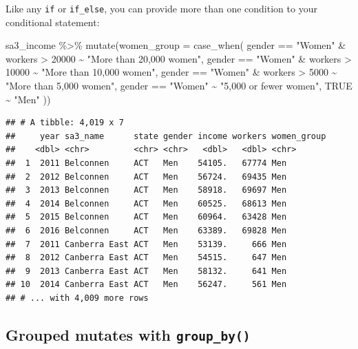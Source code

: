 \documentclass[
]{book}
\newenvironment{Shaded}{\begin{snugshade}}{\end{snugshade}}
\newcommand{\AttributeTok}[1]{\textcolor[rgb]{0.77,0.63,0.00}{#1}}
\newcommand{\ConstantTok}[1]{\textcolor[rgb]{0.00,0.00,0.00}{#1}}
\newcommand{\DecValTok}[1]{\textcolor[rgb]{0.00,0.00,0.81}{#1}}
\newcommand{\FunctionTok}[1]{\textcolor[rgb]{0.00,0.00,0.00}{#1}}
\newcommand{\NormalTok}[1]{#1}
\newcommand{\SpecialCharTok}[1]{\textcolor[rgb]{0.00,0.00,0.00}{#1}}
\newcommand{\StringTok}[1]{\textcolor[rgb]{0.31,0.60,0.02}{#1}}
\begin{document}
Like any \texttt{if} or \texttt{if\_else}, you can provide more than one condition to your conditional statement:

\begin{Shaded}
\begin{Highlighting}[]
\NormalTok{sa3\_income }\SpecialCharTok{\%\textgreater{}\%} 
  \FunctionTok{mutate}\NormalTok{(}\AttributeTok{women\_group =} \FunctionTok{case\_when}\NormalTok{(}
\NormalTok{    gender }\SpecialCharTok{==} \StringTok{"Women"} \SpecialCharTok{\&}\NormalTok{ workers }\SpecialCharTok{\textgreater{}} \DecValTok{20000} \SpecialCharTok{\textasciitilde{}} \StringTok{"More than 20,000 women"}\NormalTok{,}
\NormalTok{    gender }\SpecialCharTok{==} \StringTok{"Women"} \SpecialCharTok{\&}\NormalTok{ workers }\SpecialCharTok{\textgreater{}} \DecValTok{10000} \SpecialCharTok{\textasciitilde{}} \StringTok{"More than 10,000 women"}\NormalTok{,}
\NormalTok{    gender }\SpecialCharTok{==} \StringTok{"Women"} \SpecialCharTok{\&}\NormalTok{ workers }\SpecialCharTok{\textgreater{}}  \DecValTok{5000} \SpecialCharTok{\textasciitilde{}} \StringTok{"More than 5,000 women"}\NormalTok{,}
\NormalTok{    gender }\SpecialCharTok{==} \StringTok{"Women"}                  \SpecialCharTok{\textasciitilde{}} \StringTok{"5,000 or fewer women"}\NormalTok{,}
    \ConstantTok{TRUE} \SpecialCharTok{\textasciitilde{}} \StringTok{"Men"}
\NormalTok{  ))}
\end{Highlighting}
\end{Shaded}

\begin{verbatim}
## # A tibble: 4,019 x 7
##     year sa3_name      state gender income workers women_group
##    <dbl> <chr>         <chr> <chr>   <dbl>   <dbl> <chr>      
##  1  2011 Belconnen     ACT   Men    54105.   67774 Men        
##  2  2012 Belconnen     ACT   Men    56724.   69435 Men        
##  3  2013 Belconnen     ACT   Men    58918.   69697 Men        
##  4  2014 Belconnen     ACT   Men    60525.   68613 Men        
##  5  2015 Belconnen     ACT   Men    60964.   63428 Men        
##  6  2016 Belconnen     ACT   Men    63389.   69828 Men        
##  7  2011 Canberra East ACT   Men    53139.     666 Men        
##  8  2012 Canberra East ACT   Men    54515.     647 Men        
##  9  2013 Canberra East ACT   Men    58132.     641 Men        
## 10  2014 Canberra East ACT   Men    56247.     561 Men        
## # ... with 4,009 more rows
\end{verbatim}

\hypertarget{grouped-mutates-with-group_by}{%
\subsection{\texorpdfstring{Grouped mutates with \texttt{group\_by()}}{Grouped mutates with group\_by()}}\label{grouped-mutates-with-group_by}}
\end{document}

